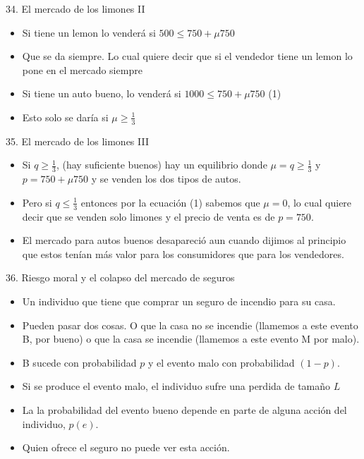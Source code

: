 \documentclass[14pt]{beamer}
\begin{document}
\begin{frame}{34. El mercado de los limones II}
\begin{itemize}
    \item Si tiene un lemon lo venderá si 
    $500 \leq 750 + \mu 750$
    \item Que se da siempre. Lo cual quiere decir que si el vendedor tiene un lemon lo pone en el mercado siempre
    \item Si tiene un auto bueno, lo venderá si 
    $1000 \leq 750 + \mu 750 $ (1)
    \item Esto solo se daría si $\mu \geq \frac{1}{3}$ 
\end{itemize}
\end{frame}

\begin{frame}{35. El mercado de los limones III}
\begin{itemize}
\item  Si $ q \geq \frac{1}{3}$, (hay suficiente buenos) hay un equilibrio donde $\mu = q \geq \frac{1}{3}$ y $p= 750 + \mu 750$ y se venden los dos tipos de autos. 
\item Pero si $q \leq \frac{1}{3}$ entonces por la ecuación (1) sabemos que $\mu=0 $, lo cual quiere decir que se venden solo limones y el precio de venta es de $p= 750$. 
\item El mercado para autos buenos desapareció aun cuando dijimos al principio que estos tenían más valor para los consumidores que para los vendedores. %

\end{itemize} 
\end{frame}

\begin{frame}{36. Riesgo moral y el colapso del mercado de seguros}
 \begin{itemize}
     \item Un individuo que tiene que comprar un seguro de incendio para su casa. 
     \item Pueden pasar dos cosas. O que la casa no se incendie (llamemos a este evento B, por bueno) o que la casa se incendie (llamemos a este evento M por malo). 
    \item B sucede con probabilidad $p$ y el evento malo con probabilidad $(1-p)$. 
    \item Si se produce el evento malo, el individuo sufre una perdida de tamaño $L$
    \item La la probabilidad del evento bueno depende en parte de alguna acción del individuo, $p(e)$.
    \item Quien ofrece el seguro no puede ver esta acción. 
\end{itemize}
\end{frame}
\end{document}
